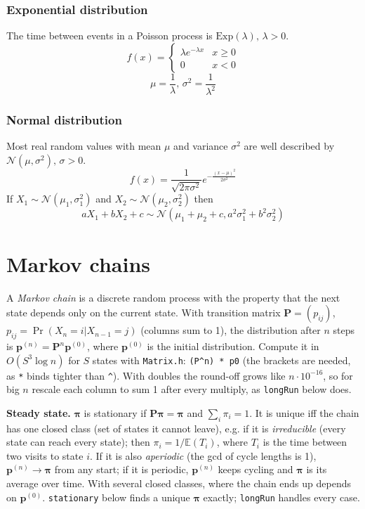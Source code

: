 \subsubsection{Exponential distribution}
The time between events in a Poisson process is $\textrm{Exp}(\lambda),\,\lambda>0$.
\[f(x) = \left\{
\begin{array}{cl}
\lambda e^{-\lambda x} & x\geq0\\
0 & x<0
\end{array}\right.\]
\[\mu=\frac{1}{\lambda},\,\sigma^2=\frac{1}{\lambda^2}\]

\subsubsection{Normal distribution}
Most real random values with mean $\mu$ and variance $\sigma^2$ are well described by $\mathcal{N}(\mu,\sigma^2),\,\sigma>0$.
\[ f(x) = \frac{1}{\sqrt{2\pi\sigma^2}}e^{-\frac{(x-\mu)^2}{2\sigma^2}} \]
If $X_1 \sim \mathcal{N}(\mu_1,\sigma_1^2)$ and $X_2 \sim \mathcal{N}(\mu_2,\sigma_2^2)$ then
\[ aX_1 + bX_2 + c \sim \mathcal{N}(\mu_1+\mu_2+c,a^2\sigma_1^2+b^2\sigma_2^2) \]

\section{Markov chains}
A \emph{Markov chain} is a discrete random process with the property that the next state depends only on the current state.
With transition matrix $\mathbf{P} = (p_{ij})$, $p_{ij} = \Pr(X_n = i | X_{n-1} = j)$ (columns sum to 1),
the distribution after $n$ steps is $\mathbf{p}^{(n)} = \mathbf P^n \mathbf p^{(0)}$, where $\mathbf{p}^{(0)}$ is the initial distribution.
Compute it in $O(S^3 \log n)$ for $S$ states with \texttt{Matrix.h}: \texttt{(P\textasciicircum n) * p0}
(the brackets are needed, as \texttt{*} binds tighter than \texttt{\textasciicircum}).
With doubles the round-off grows like $n \cdot 10^{-16}$, so for big $n$ rescale each column to sum 1 after every multiply, as \texttt{longRun} below does.

\textbf{Steady state.} $\mathbf{\pi}$ is stationary if $\mathbf P \mathbf{\pi} = \mathbf{\pi}$ and $\sum_i \pi_i = 1$.
It is unique iff the chain has one closed class (set of states it cannot leave), e.g. if it is \emph{irreducible} (every state can reach every state);
then $\pi_i = 1/\mathbb{E}(T_i)$, where $T_i$ is the time between two visits to state $i$.
If it is also \emph{aperiodic} (the gcd of cycle lengths is 1), $\mathbf p^{(n)} \to \mathbf{\pi}$ from any start;
if it is periodic, $\mathbf p^{(n)}$ keeps cycling and $\mathbf{\pi}$ is its average over time.
With several closed classes, where the chain ends up depends on $\mathbf p^{(0)}$.
\texttt{stationary} below finds a unique $\mathbf{\pi}$ exactly; \texttt{longRun} handles every case.

